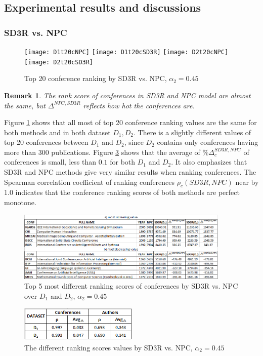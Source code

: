 \documentclass[10pt,leqno,twoside]{article}
\newtheorem{remark}{\indent Remark}[section]
\begin{document}
\subsection{Experimental results and discussions}\label{Sect:Result}

\subsubsection{SD3R vs. NPC}
%
\begin{figure} %
	\caption{Top 20 conference ranking by SD3R vs. NPC, $\alpha_2=0.45$}
	\label{Fig:Top20Conference}
    \centering
    \texttt{[image: D1t20cNPC]}
    \texttt{[image: D1t20cSD3R]}
    \texttt{[image: D2t20cNPC]}
    \texttt{[image: D2t20cSD3R]}
\end{figure}

\begin{remark}
The rank score of conferences in SD3R and NPC model are almost the same, but $\Delta^{NPC,SD3R}$ reflects how hot the conferences are.
\end{remark}

Figure \ref{Fig:Top20Conference} shows that all most of top 20 conference ranking values are the same for both methods and in both dataset $D_1, D_2$. There is a slightly different values of top 20 conferences between $D_1$ and $D_2$, since $D_2$ contains only conferences having more than 300 publications. 
Figure \ref{Fig:DeltaRho} shows that the average of $\%\Delta^{SD3R, NPC}_c$ of conferences is small, less than $0.1$ for both $D_1$ and $D_2$. It also emphasizes that SD3R and NPC methods give very similar results when ranking conferences.
The Spearman correlation coefficient of ranking conferences $\rho_c(SD3R,NPC)$ near by 1.0 indicates that the conference ranking scores of both methods are perfect monotone.
%
\begin{figure} %
	\caption{Top 5 most different ranking scores of conferences by SD3R vs. NPC over $D_1$ and $D_2$, $\alpha_2=0.45$}
	\label{Fig:Top5Inc}
    \centering
    \includegraphics[width=0.9\textwidth]{Top5cInc}
\end{figure}
%
%
\begin{figure} 
	\caption{The different ranking scores values by SD3R vs. NPC, $\alpha_2=0.45$}
	\label{Fig:DeltaRho}
    \centering
    \includegraphics[width=0.5\textwidth]{delta_rho}
\end{figure}
%
\end{document}
